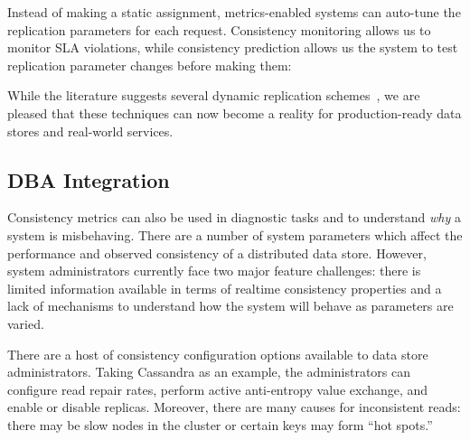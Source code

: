 Instead of making a static assignment, metrics-enabled systems can
auto-tune the replication parameters for each request. Consistency
monitoring allows us to monitor SLA violations, while consistency
prediction allows us the system to test replication parameter changes
before making them:


While the literature suggests several dynamic replication
schemes~\cite{vahdat-article}, we are pleased that these techniques
can now become a reality for production-ready data stores and
real-world services.

\subsection{DBA Integration}
\label{sec:dba}

Consistency metrics can also be used in diagnostic tasks and to
understand \textit{why} a system is misbehaving. There are a number of
system parameters which affect the performance and observed
consistency of a distributed data store. However, system
administrators currently face two major feature challenges: there is
limited information available in terms of realtime consistency
properties and a lack of mechanisms to understand how the system will
behave as parameters are varied.


There are a host of consistency configuration options available to
data store administrators. Taking Cassandra as an example, the
administrators can configure read repair rates, perform active
anti-entropy value exchange, and enable or disable replicas. Moreover,
there are many causes for inconsistent reads: there may be slow nodes
in the cluster or certain keys may form ``hot spots.''


